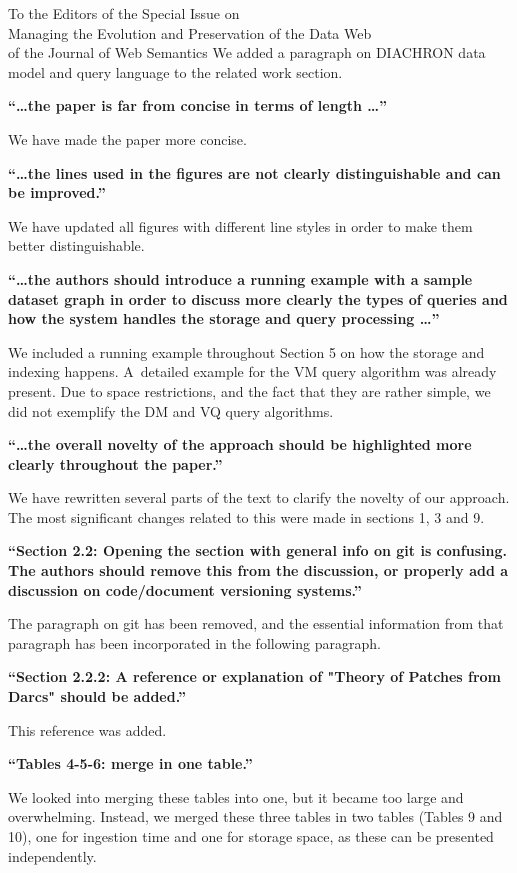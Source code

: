 \documentclass{letter}
\newcounter{section}
\begin{document}
\begin{letter}{To the Editors of the Special Issue on\\Managing the Evolution and Preservation of the Data Web\\of the Journal of Web Semantics}
We added a paragraph on DIACHRON data model and query language to the related work section.

\textbf{\enquote{\ldots the paper is far from concise in terms of length \ldots}}

We have made the paper more concise.

\textbf{\enquote{\ldots the lines used in the figures are not clearly distinguishable and can be improved.}}

We have updated all figures with different line styles in order to make them better distinguishable.

\textbf{\enquote{\ldots the authors should introduce a running example with a sample dataset graph in order to discuss more clearly the types of queries and how the system handles the storage and query processing \ldots}}

We included a running example throughout Section 5 on how the storage and indexing happens.
A~detailed example for the VM query algorithm was already present.
Due to space restrictions, and the fact that they are rather simple, we did not exemplify the DM and VQ query algorithms.

\pagebreak
\textbf{\enquote{\ldots the overall novelty of the approach should be highlighted more clearly throughout the paper.}}

We have rewritten several parts of the text to clarify the novelty of our approach.
The most significant changes related to this were made in sections 1, 3 and 9.

\textbf{\enquote{Section 2.2: Opening the section with general info on git is confusing. The authors should remove this from the discussion, or properly add a discussion on code/document versioning systems.}}

The paragraph on git has been removed, and the essential information from that paragraph has been incorporated in the following paragraph.

\textbf{\enquote{Section 2.2.2: A reference or explanation of "Theory of Patches from Darcs" should be added.}}

This reference was added.

\textbf{\enquote{Tables 4-5-6: merge in one table.}}

We looked into merging these tables into one,
but it became too large and overwhelming.
Instead, we merged these three tables in two tables (Tables 9 and 10),
one for ingestion time and one for storage space, as these can be presented independently.


\end{letter}
\end{document}
